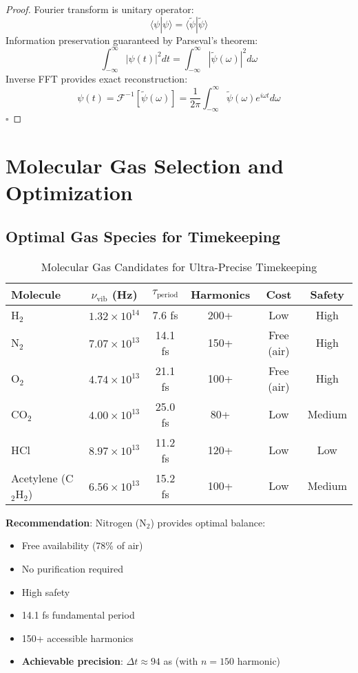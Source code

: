 \documentclass[12pt,a4paper]{article}
\begin{document}
\begin{proof}
Fourier transform is unitary operator:
\begin{equation}
\langle \psi | \psi \rangle = \langle \tilde{\psi} | \tilde{\psi} \rangle
\end{equation}
Information preservation guaranteed by Parseval's theorem:
\begin{equation}
\int_{-\infty}^{\infty} |\psi(t)|^2 dt = \int_{-\infty}^{\infty} |\tilde{\psi}(\omega)|^2 d\omega
\end{equation}
Inverse FFT provides exact reconstruction:
\begin{equation}
\psi(t) = \mathcal{F}^{-1}[\tilde{\psi}(\omega)] = \frac{1}{2\pi}\int_{-\infty}^{\infty} \tilde{\psi}(\omega) e^{i\omega t} d\omega
\end{equation}
$\square$
\end{proof}

\section{Molecular Gas Selection and Optimization}

\subsection{Optimal Gas Species for Timekeeping}

\begin{table}[H]
\centering
\caption{Molecular Gas Candidates for Ultra-Precise Timekeeping}
\begin{tabular}{lccccc}
\toprule
Molecule & $\nu_{\text{vib}}$ (Hz) & $\tau_{\text{period}}$ & Harmonics & Cost & Safety \\
\midrule
H$_2$ & $1.32 \times 10^{14}$ & 7.6 fs & 200+ & Low & High \\
N$_2$ & $7.07 \times 10^{13}$ & 14.1 fs & 150+ & Free (air) & High \\
O$_2$ & $4.74 \times 10^{13}$ & 21.1 fs & 100+ & Free (air) & High \\
CO$_2$ & $4.00 \times 10^{13}$ & 25.0 fs & 80+ & Low & Medium \\
HCl & $8.97 \times 10^{13}$ & 11.2 fs & 120+ & Low & Low \\
Acetylene (C$_2$H$_2$) & $6.56 \times 10^{13}$ & 15.2 fs & 100+ & Low & Medium \\
\bottomrule
\end{tabular}
\end{table}

\textbf{Recommendation}: Nitrogen (N$_2$) provides optimal balance:
\begin{itemize}
\item Free availability (78\% of air)
\item No purification required
\item High safety
\item 14.1 fs fundamental period
\item 150+ accessible harmonics
\item \textbf{Achievable precision}: $\Delta t \approx 94$ as (with $n=150$ harmonic)
\end{itemize}
\end{document}
